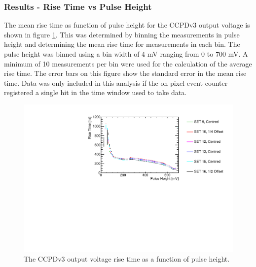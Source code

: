 \subsubsection{Results - Rise Time vs Pulse Height}
\label{sec:resultsrisetimepulseheight}
The mean rise time as function of pulse height for the CCPDv3 output voltage is shown in figure \ref{fig:risetime}.  This was determined by binning the measurements in pulse height and determining the mean rise time for measurements in each bin.  The pulse height was binned using a bin width of 4 mV ranging from 0 to 700 mV.  A minimum of 10 measurements per bin were used for the calculation of the average rise time.  The error bars on this figure show the standard error in the mean rise time.  Data was only included in this analysis if the on-pixel event counter registered a single hit in the time window used to take data.

\begin{figure}[h!]
\centering
\includegraphics[width=1.0\textwidth]{CLICdpVertex/Plots/RadSourceAnalysis/AllSETs_RiseTime_PulseHeight.pdf}
\caption[The CCPDv3 output voltage rise time as a function of pulse height.]{The CCPDv3 output voltage rise time as a function of pulse height.}
\label{fig:risetime}
\end{figure}
 
